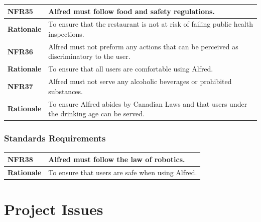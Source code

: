 \documentclass [11pt]{article}
\begin{document}
\begin{longtable}{| p{ } | p{ } | }\hline 
\rowcolor{tableCell}\textbf{NFR35} & Alfred must follow food and safety regulations. \\ \hline
\textbf{Rationale} & To ensure that the restaurant is not at risk of failing public health inspections.\\ \hline
\rowcolor{tableCell}\textbf{NFR36} & Alfred must not preform any actions that can be perceived as discriminatory to the user. \\ \hline
\textbf{Rationale} & To ensure that all users are comfortable using Alfred.\\ \hline 
\rowcolor{tableCell}\textbf{NFR37} & Alfred must not serve any alcoholic beverages or prohibited substances. \\ \hline
\textbf{Rationale} & To ensure Alfred abides by Canadian Laws and that users under the drinking age can be served.\\ \hline 
\end{longtable}

\subsubsection{Standards Requirements }

\begin{longtable}{| p{ } | p{ } | }\hline 
\rowcolor{tableCell}\textbf{NFR38} & Alfred must follow the law of robotics. \\ \hline
\textbf{Rationale} & To ensure that users are safe when using Alfred.\\ \hline 
\end{longtable}


\section {Project Issues} 

\end{document}
